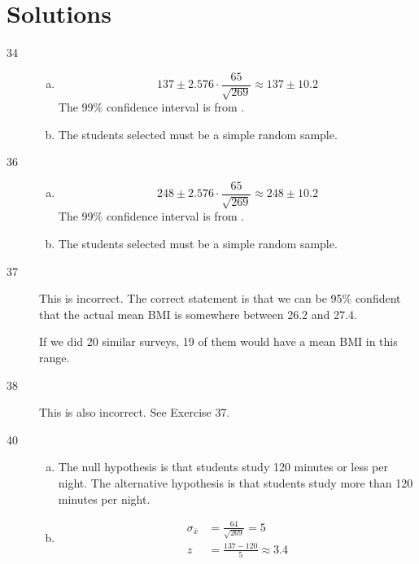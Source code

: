 \documentclass[letterpaper]{exam}
\begin{document}
    \section{Solutions}
    \begin{description}

      \item[34] 
        \begin{enumerate}[(a)]
          \item 
            \[
              137 \pm 2.576 \cdot \frac{65}{\sqrt{269}} \approx 137 \pm 10.2
            \]
            The 99\% confidence interval is from .

          \item The students selected must be a simple random sample.

        \end{enumerate}

      \item[36] 
        \begin{enumerate}[(a)]
          \item 
            \[
              248 \pm 2.576 \cdot \frac{65}{\sqrt{269}} \approx 248 \pm 10.2
            \]
            The 99\% confidence interval is from .

          \item The students selected must be a simple random sample.

        \end{enumerate}

      \item[37] This is incorrect. The correct statement is that we can be 95\%
        confident that the actual mean BMI is somewhere between 26.2 and 27.4.

        If we did 20 similar surveys, 19 of them would have a mean BMI in this
        range.

      \item[38] This is also incorrect. See Exercise 37.

      \item[40]
        \begin{enumerate}[(a)]
          \item The null hypothesis is that students study 120 minutes or less
            per night. The alternative hypothesis is that students study more
            than 120 minutes per night.

          \item
            \begin{align*}
              \sigma_{\bar{x}} & = \frac{64}{\sqrt{269}} = 5 \\
              z                & = \frac{137 - 120}{5} \approx 3.4
            \end{align*}


\end{enumerate}
\end{description}
\end{document}
